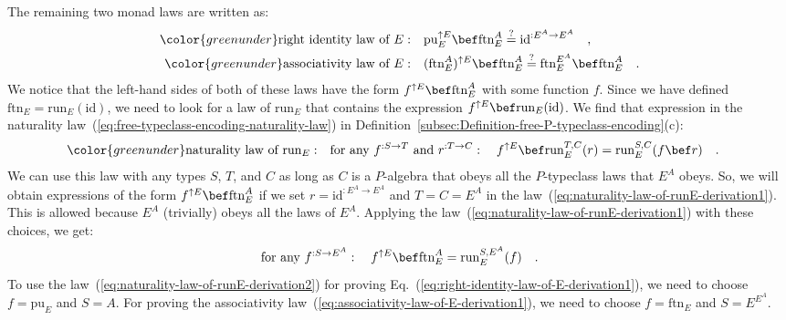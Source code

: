 The remaining two monad laws are written as:
\begin{align}
{\color{greenunder}\text{right identity law of }E:}\quad & \text{pu}_{E}^{\uparrow E}\bef\text{ftn}_{E}^{A}\overset{?}{=}\text{id}^{:E^{A}\rightarrow E^{A}}\quad,\label{eq:right-identity-law-of-E-derivation1}\\
{\color{greenunder}\text{associativity law of }E:}\quad & (\text{ftn}_{E}^{A})^{\uparrow E}\bef\text{ftn}_{E}^{A}\overset{?}{=}\text{ftn}_{E}^{E^{A}}\bef\text{ftn}_{E}^{A}\quad.\label{eq:associativity-law-of-E-derivation1}
\end{align}
 We notice that the left-hand sides of both of these laws have the
form $f^{\uparrow E}\bef\text{ftn}_{E}^{A}$ with some function $f$.
Since we have defined $\text{ftn}_{E}=\text{run}_{E}(\text{id})$,
we need to look for a law of $\text{run}_{E}$ that contains the expression
$f^{\uparrow E}\bef\text{run}_{E}(\text{id})$. We find that expression
in the naturality law~(\ref{eq:free-typeclass-encoding-naturality-law})
in Definition~\ref{subsec:Definition-free-P-typeclass-encoding}(c):
\begin{align}
{\color{greenunder}\text{naturality law of }\text{run}_{E}:}\quad & \text{for any }f^{:S\rightarrow T}\text{ and }r^{:T\rightarrow C}:\quad f^{\uparrow E}\bef\text{run}_{E}^{T,C}(r)=\text{run}_{E}^{S,C}(f\bef r)\quad.\label{eq:naturality-law-of-runE-derivation1}
\end{align}
We can use this law with any types $S$, $T$, and $C$ as long as
$C$ is a $P$-algebra that obeys all the $P$-typeclass laws that
$E^{A}$ obeys. So, we will obtain expressions of the form $f^{\uparrow E}\bef\text{ftn}_{E}^{A}$
if we set $r=\text{id}^{:E^{A}\rightarrow E^{A}}$ and $T=C=E^{A}$
in the law~(\ref{eq:naturality-law-of-runE-derivation1}). This is
allowed because $E^{A}$ (trivially) obeys all the laws of $E^{A}$.
Applying the law~(\ref{eq:naturality-law-of-runE-derivation1}) with
these choices, we get:
\begin{equation}
\text{for any }f^{:S\rightarrow E^{A}}:\quad f^{\uparrow E}\bef\text{ftn}_{E}^{A}=\text{run}_{E}^{S,E^{A}}(f)\quad.\label{eq:naturality-law-of-runE-derivation2}
\end{equation}
To use the law~(\ref{eq:naturality-law-of-runE-derivation2}) for
proving Eq.~(\ref{eq:right-identity-law-of-E-derivation1}), we need
to choose $f=\text{pu}_{E}$ and $S=A$. For proving the associativity
law~(\ref{eq:associativity-law-of-E-derivation1}), we need to choose
$f=\text{ftn}_{E}$ and $S=E^{E^{A}}$. 

